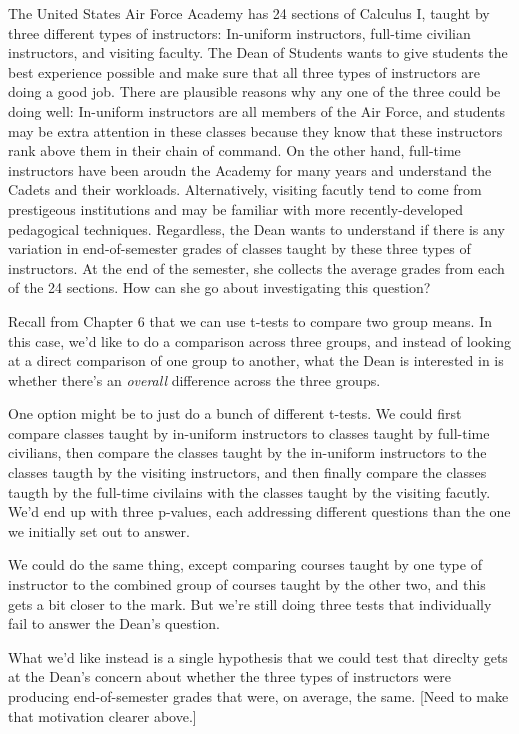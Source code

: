 \documentclass[
]{book}
\theoremstyle{definition}
\theoremstyle{definition}
\theoremstyle{definition}
\theoremstyle{remark}
\begin{document}
The United States Air Force Academy has 24 sections of Calculus I, taught by three different types of instructors: In-uniform instructors, full-time civilian instructors, and visiting faculty. The Dean of Students wants to give students the best experience possible and make sure that all three types of instructors are doing a good job. There are plausible reasons why any one of the three could be doing well: In-uniform instructors are all members of the Air Force, and students may be extra attention in these classes because they know that these instructors rank above them in their chain of command. On the other hand, full-time instructors have been aroudn the Academy for many years and understand the Cadets and their workloads. Alternatively, visiting facutly tend to come from prestigeous institutions and may be familiar with more recently-developed pedagogical techniques. Regardless, the Dean wants to understand if there is any variation in end-of-semester grades of classes taught by these three types of instructors. At the end of the semester, she collects the average grades from each of the 24 sections. How can she go about investigating this question?

Recall from Chapter 6 that we can use t-tests to compare two group means. In this case, we'd like to do a comparison across three groups, and instead of looking at a direct comparison of one group to another, what the Dean is interested in is whether there's an \emph{overall} difference across the three groups.

One option might be to just do a bunch of different t-tests. We could first compare classes taught by in-uniform instructors to classes taught by full-time civilians, then compare the classes taught by the in-uniform instructors to the classes taugth by the visiting instructors, and then finally compare the classes taugth by the full-time civilains with the classes taught by the visiting facutly. We'd end up with three p-values, each addressing different questions than the one we initially set out to answer.

We could do the same thing, except comparing courses taught by one type of instructor to the combined group of courses taught by the other two, and this gets a bit closer to the mark. But we're still doing three tests that individually fail to answer the Dean's question.

What we'd like instead is a single hypothesis that we could test that direclty gets at the Dean's concern about whether the three types of instructors were producing end-of-semester grades that were, on average, the same. {[}Need to make that motivation clearer above.{]}
\end{document}
